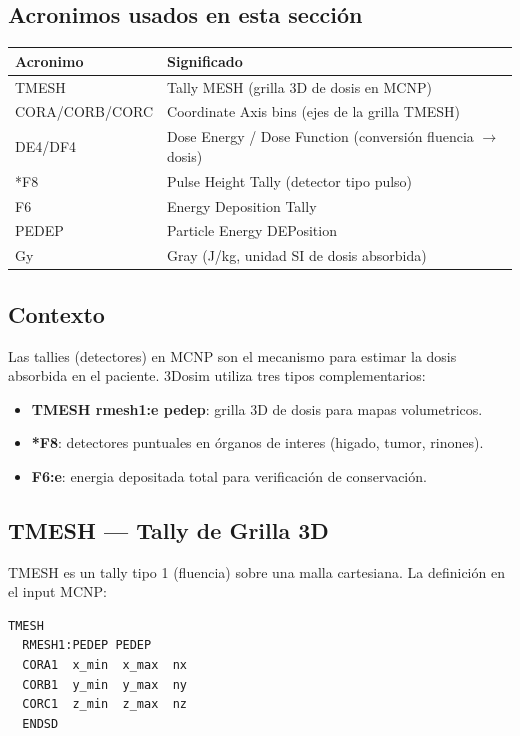\documentclass[12pt,a4paper]{article}
\begin{document}
\subsection*{Acronimos usados en esta sección}
\begin{tabular}{ll}
\toprule
\textbf{Acronimo} & \textbf{Significado} \\
\midrule
TMESH & Tally MESH (grilla 3D de dosis en MCNP) \\
CORA/CORB/CORC & Coordinate Axis bins (ejes de la grilla TMESH) \\
DE4/DF4 & Dose Energy / Dose Function (conversión fluencia $\to$ dosis) \\
*F8 & Pulse Height Tally (detector tipo pulso) \\
F6 & Energy Deposition Tally \\
PEDEP & Particle Energy DEPosition \\
Gy & Gray (J/kg, unidad SI de dosis absorbida) \\
\bottomrule
\end{tabular}

\subsection{Contexto}

Las tallies (detectores) en MCNP son el mecanismo para estimar la dosis absorbida en el paciente. 3Dosim utiliza tres tipos complementarios:

\begin{itemize}
    \item \textbf{TMESH rmesh1:e pedep}: grilla 3D de dosis para mapas volumetricos.
    \item \textbf{*F8}: detectores puntuales en órganos de interes (higado, tumor, rinones).
    \item \textbf{F6:e}: energia depositada total para verificación de conservación.
\end{itemize}

\subsection{TMESH --- Tally de Grilla 3D}

TMESH es un tally tipo 1 (fluencia) sobre una malla cartesiana. La definición en el input MCNP:

\begin{lstlisting}
TMESH
  RMESH1:PEDEP PEDEP
  CORA1  x_min  x_max  nx
  CORB1  y_min  y_max  ny
  CORC1  z_min  z_max  nz
  ENDSD
\end{lstlisting}
\end{document}
